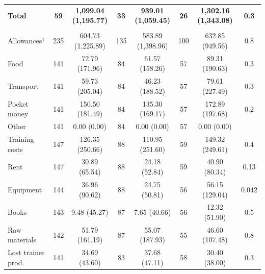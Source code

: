 \documentclass[
  11pt,
a4paper
]{report}
\begin{document}
\begin{table}[H]
{\begin{threeparttable}
\begin{tabular}[t]{lccccccc}
\textbf{\hspace{1em}Total} & \textbf{59} & \textbf{1,099.04 (1,195.77)} & \textbf{33} & \textbf{939.01 (1,059.45)} & \textbf{26} & \textbf{1,302.16 (1,343.08)} & \textbf{0.3}\\
\addlinespace[0.3em]
\multicolumn{8}{l}{\textbf{Costs}}\\
\hspace{1em}Allowances¹ & 235 & 604.73 (1,225.89) & 135 & 583.89 (1,398.96) & 100 & 632.85 (949.56) & 0.8\\
\hspace{1em}\hspace{1em}Food & 141 & 72.79 (171.96) & 84 & 61.57 (158.26) & 57 & 89.31 (190.63) & 0.3\\
\hspace{1em}\hspace{1em}Transport & 141 & 59.73 (205.04) & 84 & 46.23 (188.52) & 57 & 79.61 (227.49) & 0.3\\
\hspace{1em}\hspace{1em}Pocket money & 141 & 150.50 (181.49) & 84 & 135.30 (169.17) & 57 & 172.89 (197.68) & 0.2\\
\hspace{1em}\hspace{1em}Other & 141 & 0.00 (0.00) & 84 & 0.00 (0.00) & 57 & 0.00 (0.00) & \\
\hspace{1em}Training costs & 147 & 126.35 (250.66) & 88 & 110.95 (251.60) & 59 & 149.32 (249.61) & 0.4\\
\hspace{1em}\hspace{1em}Rent & 147 & 30.89 (65.54) & 88 & 24.18 (52.84) & 59 & 40.90 (80.34) & 0.13\\
\hspace{1em}\hspace{1em}Equipment & 144 & 36.96 (90.62) & 88 & 24.75 (50.81) & 56 & 56.15 (129.04) & 0.042\\
\hspace{1em}\hspace{1em}Books & 143 & 9.48 (45.27) & 87 & 7.65 (40.66) & 56 & 12.32 (51.90) & 0.5\\
\hspace{1em}\hspace{1em}Raw materials & 142 & 51.79 (161.19) & 87 & 55.07 (187.93) & 55 & 46.60 (107.48) & 0.8\\
\hspace{1em}Lost trainer prod. & 141 & 34.69 (43.60) & 83 & 37.68 (47.11) & 58 & 30.40 (38.00) & 0.3\\

\end{tabular}
\end{threeparttable}}
\end{table}
\end{document}
